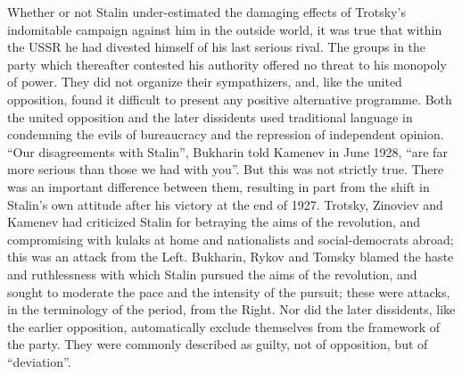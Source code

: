 Whether or not Stalin under-estimated the damaging effects of Trotsky's indomitable campaign against him in the outside world, it was true that within the USSR he had divested himself of his last serious rival. The groups in the party which thereafter contested his authority offered no threat to his monopoly of power. They did not organize their sympathizers, and, like the united opposition, found it difficult to present any positive alternative programme. Both the united opposition and the later dissidents used traditional language in condemning the evils of bureaucracy and the repression of independent opinion. ``Our disagreements with Stalin'', Bukharin told Kamenev in June 1928, ``are far more serious than those we had with you''. But this was not strictly true. There was an important difference between them, resulting in part from the shift in Stalin's own attitude after his victory at the end of 1927. Trotsky, Zinoviev and Kamenev had criticized Stalin for betraying the aims of the revolution, and compromising with kulaks at home and nationalists and social-democrats abroad; this was an attack from the Left. Bukharin, Rykov and Tomsky blamed the haste and ruthlessness with which Stalin pursued the aims of the revolution, and sought to moderate the pace and the intensity of the pursuit; these were attacks, in the terminology of the period, from the Right. Nor did the later dissidents, like the earlier opposition, automatically exclude themselves from the framework of the party. They were commonly described as guilty, not of opposition, but of ``deviation''. 

